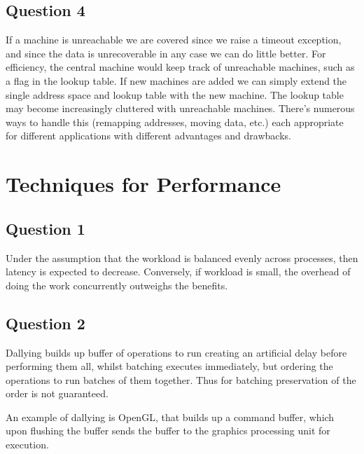 \documentclass[10pt,a4paper]{article}
\begin{document}
\subsection{Question 4}

If a machine is unreachable we are covered since we raise a timeout exception, and since the data is unrecoverable in any case we can do little better. For efficiency, the central machine would keep track of unreachable machines, such as a flag in the lookup table. If new machines are added we can simply extend the single address space and lookup table with the new machine. The lookup table may become increasingly cluttered with unreachable machines. There's numerous ways to handle this (remapping addresses, moving data, etc.) each appropriate for different applications with different advantages and drawbacks.


\section{Techniques for Performance}

\subsection{Question 1}

Under the assumption that the workload is balanced evenly across processes, then latency is expected to decrease. Conversely, if workload is small, the overhead of doing the work concurrently outweighs the benefits.

\subsection{Question 2}

Dallying builds up buffer of operations to run creating an artificial delay before performing them all, whilst batching executes immediately, but ordering the operations to run batches of them together. Thus for batching preservation of the order is not guaranteed.

An example of dallying is OpenGL, that builds up a command buffer, which upon flushing the buffer sends the buffer to the graphics processing unit for execution.
\end{document}

